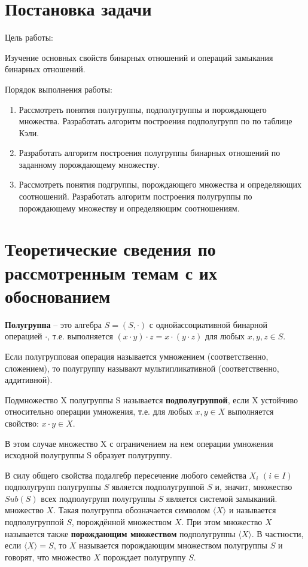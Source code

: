 \documentclass[spec, och, labwork]{shiza}
\begin{document}
\tableofcontents

\section{Постановка задачи}

Цель работы:

Изучение основных свойств бинарных отношений и операций замыкания бинарных отношений.

Порядок выполнения работы:
    \begin{enumerate}
        \item Рассмотреть понятия полугруппы, подполугруппы и порождающего множества. Разработать алгоритм построения подполугрупп по по таблице Кэли.
        \item Разработать алгоритм построения полугруппы бинарных отношений по заданному порождающему множеству.
        \item Рассмотреть понятия подгруппы, порождающего множества и определяющих соотношений. Разработать алгоритм построения полугруппы по порождающему
        множеству и определяющим соотношениям.
    \end{enumerate}

\section{Теоретические сведения по рассмотренным темам с их обоснованием}

\textbf{Полугруппа} – это алгебра $S = (S, \cdot)$ с однойассоциативной бинарной операцией $\cdot$, т.е. выполняется
$(x \cdot y) \cdot z = x \cdot (y \cdot z)$ для любых $x,y,z \in S$.

Если полугрупповая операция называется умножением (соответственно, сложением), то полугруппу называют мультипликативной
(соответственно, аддитивной).

Подмножество X полугруппы S называется \textbf{подполугруппой}, если X устойчиво относительно операции умножения, т.е. для любых
$x, y \in X$ выполняется свойство: $x \cdot y \in X$.

В этом случае множество X с ограничением на нем операции умножения исходной полугруппы S образует полугруппу.

В силу общего свойства подалгебр пересечение любого семейства $X_i$ $(i \in I)$ подполугрупп полугруппы $S$ является
подполугруппой $S$ и, значит, множество $Sub(S)$ всех подполугрупп полугруппы $S$ является системой замыканий.
множество $X$. Такая полугруппа обозначается символом $\langle X \rangle$ и называется подполугруппой $S$, порождённой множеством
$X$. При этом множество $X$ называется также \textbf{порождающим множеством} подполугруппы $\langle X \rangle$. В частности, если
$\langle X \rangle = S$, то $X$ называется порождающим множеством полугруппы $S$ и говорят, что множество $X$ порождает полугруппу
$S$.
\end{document}
